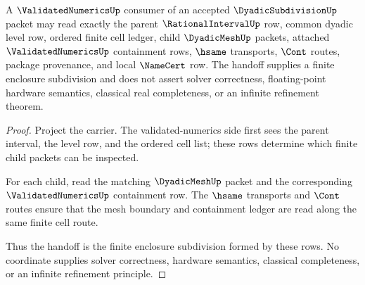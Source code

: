 \begin{theorem}
\label{thm:dyadic-subdivision-validated-enclosure-handoff}
A $\ValidatedNumericsUp$ consumer of an accepted $\DyadicSubdivisionUp$ packet may read exactly the parent $\RationalIntervalUp$ row, common dyadic level row, ordered finite cell ledger, child $\DyadicMeshUp$ packets, attached $\ValidatedNumericsUp$ containment rows, $\hsame$ transports, $\Cont$ routes, package provenance, and local $\NameCert$ row. The handoff supplies a finite enclosure subdivision and does not assert solver correctness, floating-point hardware semantics, classical real completeness, or an infinite refinement theorem.
\end{theorem}
\begin{proof}
Project the carrier. The validated-numerics side first sees the parent interval, the level row, and the ordered cell list; these rows determine which finite child packets can be inspected.

For each child, read the matching $\DyadicMeshUp$ packet and the corresponding $\ValidatedNumericsUp$ containment row. The $\hsame$ transports and $\Cont$ routes ensure that the mesh boundary and containment ledger are read along the same finite cell route.

Thus the handoff is the finite enclosure subdivision formed by these rows. No coordinate supplies solver correctness, hardware semantics, classical completeness, or an infinite refinement principle.
\end{proof}

